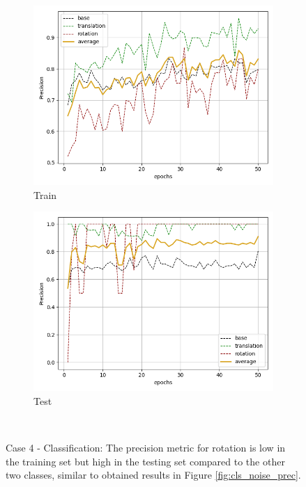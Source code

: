 \begin{figure}[H]
    \begin{subfigure}{.48\linewidth}
    \centering
    \includegraphics[scale=0.45]{Img/cls_flow_noise_train_prec.png}
    \caption{Train}
    \end{subfigure}
    \begin{subfigure}{.48\linewidth}
    \centering
    \includegraphics[scale=0.45]{Img/cls_flow_noise_test_prec.png}
    \caption{Test}
    \end{subfigure}\\
    \caption{Case 4 - Classification: The precision metric for rotation is low in the training set but high in the testing set compared to the other two classes, similar to obtained results in Figure \ref{fig:cls_noise_prec}. }
    \label{fig:cls_flow_noise_prec}
\end{figure}
